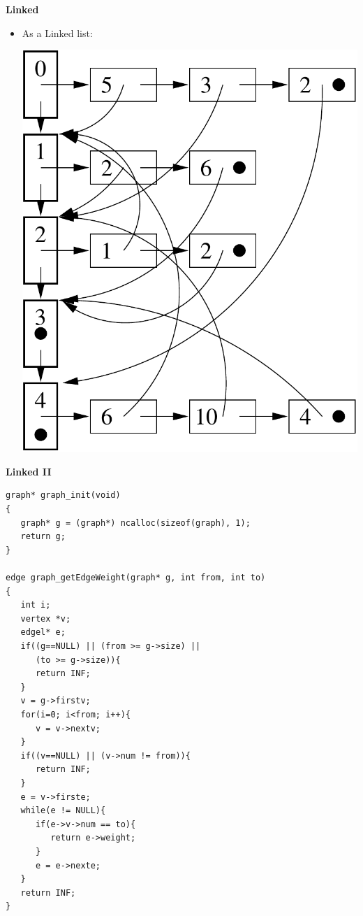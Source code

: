 \newpage
{\samepage
\begin{center}
{\Large{\bf Linked}}
\end{center}
\begin{itemize}
\item As a Linked list:
\begin{center}
\includegraphics{../Images/graphll.pdf}
\end{center}
\end{itemize}
}

\newpage
{\samepage
\begin{center}
{\Large{\bf Linked II}}
\end{center}
{\small
\begin{verbatim}
graph* graph_init(void)
{
   graph* g = (graph*) ncalloc(sizeof(graph), 1);
   return g;
}

edge graph_getEdgeWeight(graph* g, int from, int to)
{
   int i;
   vertex *v;
   edgel* e;
   if((g==NULL) || (from >= g->size) ||
      (to >= g->size)){
      return INF;
   }
   v = g->firstv;
   for(i=0; i<from; i++){
      v = v->nextv;
   }
   if((v==NULL) || (v->num != from)){
      return INF;
   }
   e = v->firste;
   while(e != NULL){
      if(e->v->num == to){
         return e->weight;
      }
      e = e->nexte;
   }
   return INF;
}
\end{verbatim}
}}


